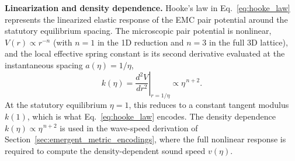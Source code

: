 \documentclass[10pt,a4paper]{article}
\begin{document}
\textbf{Linearization and density dependence.}
Hooke's law in Eq.~\eqref{eq:hooke_law} represents the linearized elastic response of the EMC pair potential around the statutory equilibrium spacing. The microscopic pair potential is nonlinear, $V(r) \propto r^{-n}$ (with $n = 1$ in the 1D reduction and $n = 3$ in the full 3D lattice), and the local effective spring constant is its second derivative evaluated at the instantaneous spacing $a(\eta) = 1/\eta$,
\begin{equation}
	k(\eta) = \left.\frac{d^2 V}{dr^2}\right|_{r=1/\eta} \propto \eta^{\,n+2}.
\end{equation}
At the statutory equilibrium $\eta = 1$, this reduces to a constant tangent modulus $k(1)$, which is what Eq.~\eqref{eq:hooke_law} encodes. The density dependence $k(\eta) \propto \eta^{\,n+2}$ is used in the wave-speed derivation of Section~\ref{sec:emergent_metric_encodings}, where the full nonlinear response is required to compute the density-dependent sound speed $v(\eta)$.
\end{document}
